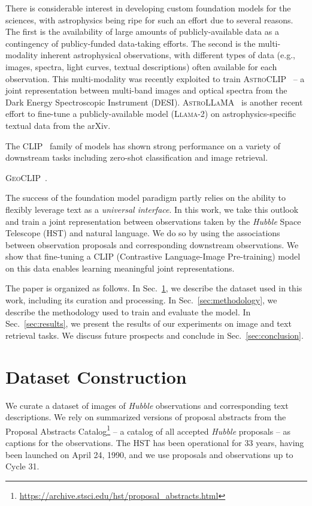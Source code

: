 \documentclass[10pt]{article} %
\newcommand{\hubble}{\emph{Hubble}\xspace}
\begin{document}
There is considerable interest in developing custom foundation models for the sciences, with astrophysics being ripe for such an effort due to several reasons. The first is the availability of large amounts of publicly-available data as a contingency of publicy-funded data-taking efforts. The second is the multi-modality inherent astrophysical observations, with different types of data (e.g., images, spectra, light curves, textual descriptions) often available for each observation. This multi-modality was recently exploited to train \textsc{AstroCLIP}~\citep{lanusse2023astroclip} -- a joint representation between multi-band images and optical spectra from the Dark Energy Spectroscopic Instrument (DESI). \textsc{AstroLLaMA}~\citep{nguyen2023astrollama} is another recent effort to fine-tune a publicly-available model (\textsc{Llama-2}) on astrophysics-specific textual data from the arXiv.

The CLIP~\citep{radford2021learning} family of models has shown strong performance on a variety of downstream tasks including zero-shot classification and image retrieval.

\textsc{GeoCLIP}~\citep{cepeda2023geoclip}.

The success of the foundation model paradigm partly relies on the ability to flexibly leverage text as a \emph{universal interface}. In this work, we take this outlook and train a joint representation between observations taken by the \hubble Space Telescope (HST) and natural language. We do so by using the associations between observation proposals and corresponding downstream observations. We show that fine-tuning a CLIP (Contrastive Language-Image Pre-training) model on this data enables learning meaningful joint representations.

The paper is organized as follows. In Sec.~\ref{sec:dataset}, we describe the dataset used in this work, including its curation and processing. In Sec.~\ref{sec:methodology}, we describe the methodology used to train and evaluate the model. In Sec.~\ref{sec:results}, we present the results of our experiments on image and text retrieval tasks. We discuss future prospects and conclude in Sec.~\ref{sec:conclusion}.

\section{Dataset Construction}
\label{sec:dataset}

We curate a dataset of images of \hubble observations and corresponding text descriptions. We rely on summarized versions of proposal abstracts from the Proposal Abstracts Catalog\footnote{\url{https://archive.stsci.edu/hst/proposal_abstracts.html}} -- a catalog of all accepted \hubble proposals -- as captions for the observations. The HST has been operational for 33 years, having been launched on April 24, 1990, and we use proposals and observations up to Cycle 31. 
\end{document}

